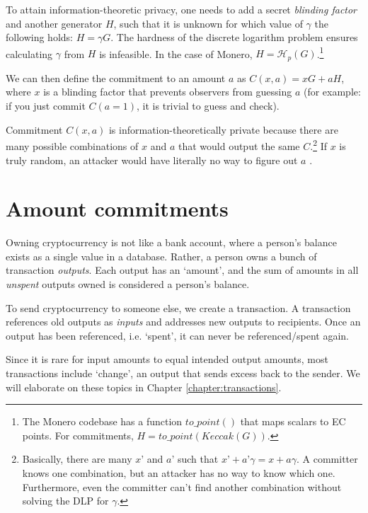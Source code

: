 To attain information-theoretic privacy, one needs to add a secret {\em blinding factor} and another generator \(H\), such that it is unknown for which value of \(\gamma\) the following holds: \(H = \gamma G\). The hardness of the discrete logarithm problem ensures calculating $\gamma$ from $H$ is infeasible. In the case of Monero, $H = \mathcal{H}_p(G)$.\footnote{\label{hashtopoint_note}The Monero codebase has a function $to\_point()$ that maps scalars to EC points. For commitments, $H = to\_point(\mathit{Keccak}(G))$.}%

We can then define the commitment to an amount \(a\) as \(C(x, a) = x G + a H\), where \(x\) is a blinding factor that prevents observers from guessing $a$ (for example: if you just commit $C(a=1)$, it is trivial to guess and check). 

Commitment $C(x, a)$ is information-theoretically private because there are many possible combinations of $x$ and $a$ that would output the same $C$.\footnote{Basically, there are many $x’$ and $a’$ such that $x’+a’ \gamma = x+a \gamma$. A committer knows one combination, but an attacker has no way to know which one. Furthermore, even the committer can't find another combination without solving the DLP for $\gamma$.} If $x$ is truly random, an attacker would have literally no way to figure out $a$ \cite{maxwell-ct, SCOZZAFAVA1993313}.%
\\




\section{Amount commitments}
\label{sec:pedersen_monero}

Owning cryptocurrency is not like a bank account, where a person’s balance exists as a single value in a database. Rather, a person owns a bunch of transaction {\em outputs}. Each output has an `amount’, and the sum of amounts in all {\em unspent} outputs owned is considered a person’s balance.

To send cryptocurrency to someone else, we create a transaction. A transaction references old outputs as {\em inputs} and addresses new outputs to recipients. Once an output has been referenced, i.e. `spent', it can never be referenced/spent again.

Since it is rare for input amounts to equal intended output amounts, most transactions include `change’, an output that sends excess back to the sender. We will elaborate on these topics in Chapter \ref{chapter:transactions}.

